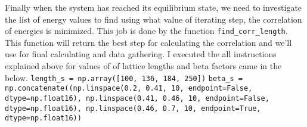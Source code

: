 \documentclass[12pt, a4paper]{article}
\begin{document}
\newline
Finally when the system has reached its equilibrium state, we need to investigate the list of energy values to find using what value of iterating step, the correlation of energies is minimized. This job is done by the function \verb|find_corr_length|. This function will return the best step for calculating the correlation and we'll use for final calculating and data gathering.
\newline
I executed the all instructions explained above for values of of lattice lengths and beta factors came in the below.
\newline
\verb|length_s = np.array([100, 136, 184, 250])|
\newline
	\verb|beta_s = np.concatenate((np.linspace(0.2, 0.41, 10, endpoint=False, dtype=np.float16), np.linspace(0.41, 0.46, 10, endpoint=False, dtype=np.float16), np.linspace(0.46, 0.7, 10, endpoint=True, dtype=np.float16))|
\end{document}
